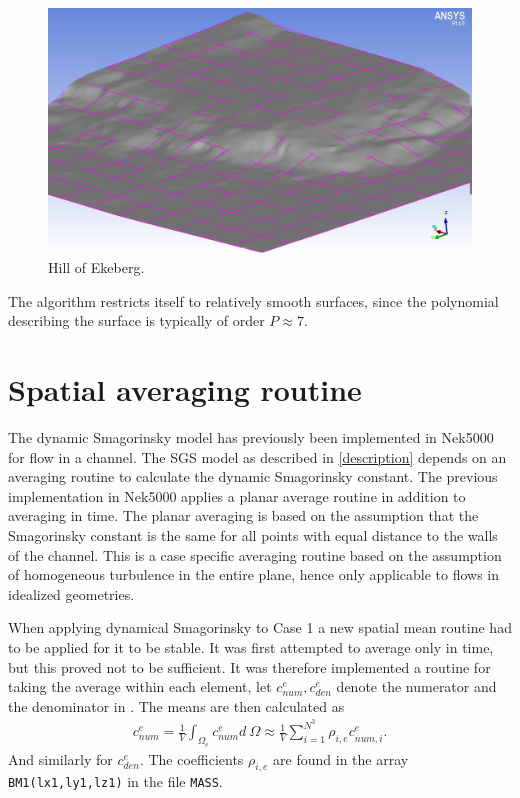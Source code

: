 %
%
\begin{figure}[h]
    \centering
  \includegraphics[width=0.7\linewidth]{Figures/mesh_ekeberg.jpg}
	\caption{Hill of Ekeberg.}
	\label{fig:hill}
\end{figure}
%
The algorithm restricts itself to relatively smooth surfaces, since the polynomial 
describing the surface is typically of order $P \approx 7$.
%
\section{Spatial averaging routine}\label{avgroutine}
The dynamic Smagorinsky model has previously been implemented in Nek5000 for flow in a channel. 
The SGS model as described in \cref{description} depends on an averaging routine to calculate
the dynamic Smagorinsky constant. The previous implementation in Nek5000 applies a planar average routine
in addition to averaging in time. The planar averaging is based on the assumption that the Smagorinsky 
constant is the same for all points with equal distance to the walls of the channel.
This is a case specific averaging routine based on the assumption of homogeneous turbulence 
in the entire plane, hence only applicable to flows in idealized geometries.

When applying dynamical Smagorinsky to Case 1 a new spatial mean routine had to be applied for it to be stable. 
It was first attempted to average only in time, but this proved not to be sufficient. It was
therefore implemented a routine for taking the average within each element, let 
$c_{num}^e,c_{den}^e$ denote the numerator and the denominator in .
The means are then calculated as 
\begin{align}
    c_{num}^e = \frac{1}{V}\int_{\Omega_e}c_{num}^e d\: \Omega 
    \approx \frac{1}{V}\sum_{i = 1}^{N^3}\rho_{i,e}c_{num,i}^{e}.
    \label{eq:averageroutine}
\end{align}
And similarly for $c_{den}^e$.
The coefficients $\rho_{i,e}$ are found in the array \verb|BM1(lx1,ly1,lz1)| in the file 
\verb|MASS|.
